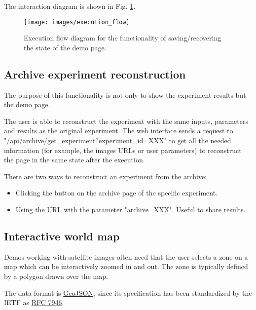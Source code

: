 The interaction diagram is shown in Fig. \ref{fig:execution_flow}.

\begin{figure}[h]
	\centering
	\texttt{[image: images/execution\_flow]}
	\caption{Execution flow diagram for the functionality of saving/recovering the state of the demo page.} 
	\label{fig:execution_flow}
\end{figure}

\subsection{Archive experiment reconstruction}
The purpose of this functionality is not only to show the experiment results but the demo page.

The user is able to reconstruct the experiment with the same inputs, parameters and results as the original experiment. The web interface sends a request to "/api/archive/get\_experiment?experiment\_id=XXX" to get all the needed information (for example, the images URLs or user parameters) to reconstruct the page in the same state after the execution. 

\bigbreak

There are two ways to reconstruct an experiment from the archive:
\begin{itemize}
	\item Clicking the button on the archive page of the specific experiment.
	\item Using the URL with the parameter  "archive=XXX". Useful to share results.
\end{itemize}

\subsection{Interactive world map}
Demos working with satellite images often need that the user selects a zone on a map which can be interactively zoomed in and out. The zone is typically defined by a polygon drawn over the map.

The data format is \href{https://geojson.org/}{GeoJSON}, since its specification has been standardized by the IETF as \href{https://www.rfc-editor.org/rfc/rfc7946}{RFC 7946}.












